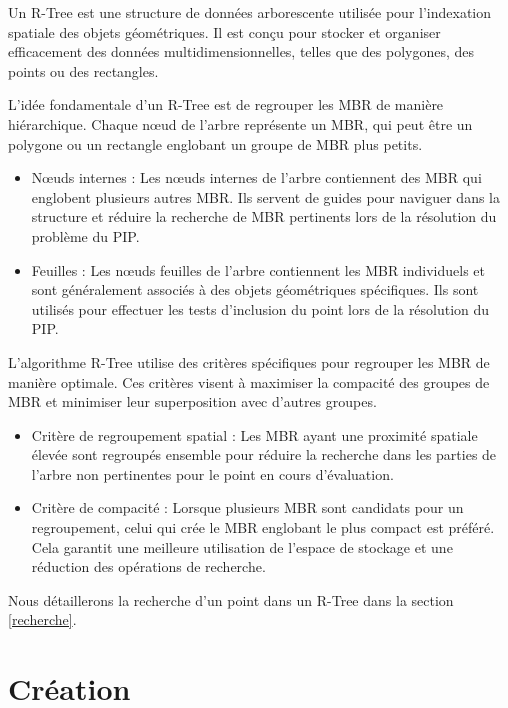 \documentclass {article}
\begin{document}
Un R-Tree est une structure de données arborescente utilisée pour l'indexation spatiale des
objets géométriques. Il est conçu pour stocker et organiser efficacement des données
multidimensionnelles, telles que des polygones, des points ou des rectangles.

L'idée fondamentale d'un R-Tree est de regrouper les MBR de manière hiérarchique.
Chaque nœud de l'arbre représente un MBR, qui peut être un polygone ou un rectangle englobant
un groupe de MBR plus petits.
\begin{itemize}

    \item Nœuds internes : Les nœuds internes de l'arbre contiennent des MBR qui englobent
	plusieurs autres MBR.
	Ils servent de guides pour naviguer dans la structure et réduire la recherche de MBR
	pertinents lors de la résolution du problème du PIP.

    \item Feuilles : Les nœuds feuilles de l'arbre contiennent les MBR individuels et sont
	généralement associés à des objets géométriques spécifiques.
	Ils sont utilisés pour effectuer les tests d'inclusion du point lors de	la résolution
	du PIP.
\end{itemize}

L'algorithme R-Tree utilise des critères spécifiques pour regrouper les MBR de manière optimale.
Ces critères visent à maximiser la compacité des groupes de MBR et minimiser leur superposition
avec d'autres groupes.

\begin{itemize}
    \item Critère de regroupement spatial : Les MBR ayant une proximité spatiale élevée sont
	regroupés ensemble pour réduire la recherche dans les parties de l'arbre non pertinentes
	pour le point en cours d'évaluation.

    \item Critère de compacité : Lorsque plusieurs MBR sont candidats pour un regroupement,
	celui qui crée le MBR englobant le plus compact est préféré.
	Cela garantit une meilleure utilisation de l'espace de stockage et une réduction des
	opérations de recherche.

\end{itemize}
Nous détaillerons la recherche d'un point dans un R-Tree dans la section \ref{recherche}.

\section {Création}
\end{document}
